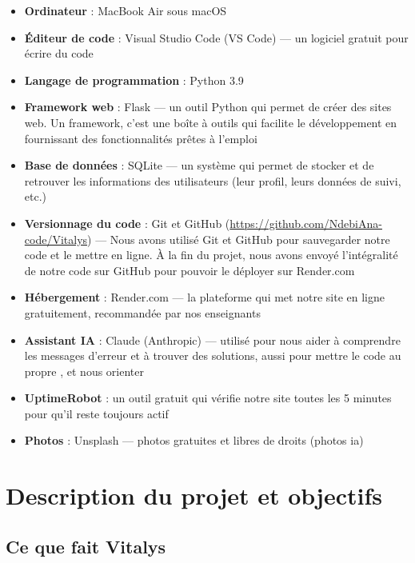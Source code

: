\documentclass[a4paper, 12pt, twoside]{article}
\begin{document}
\begin{itemize}
    \item \textbf{Ordinateur} : MacBook Air sous macOS
    \item \textbf{Éditeur de code} : Visual Studio Code (VS Code) — un logiciel gratuit pour écrire du code
    \item \textbf{Langage de programmation} : Python 3.9
    \item \textbf{Framework web} : Flask — un outil Python qui permet de créer des sites web. Un framework, c'est une boîte à outils qui facilite le développement en fournissant des fonctionnalités prêtes à l'emploi
    \item \textbf{Base de données} : SQLite — un système qui permet de stocker et de retrouver les informations des utilisateurs (leur profil, leurs données de suivi, etc.)
    \item \textbf{Versionnage du code} : Git et GitHub (\url{https://github.com/NdebiAna-code/Vitalys}) — Nous avons utilisé Git et GitHub pour sauvegarder notre code et le mettre en ligne. À la fin du projet, nous avons envoyé l’intégralité de notre code sur GitHub pour pouvoir le déployer sur Render.com    \item \textbf{Hébergement} : Render.com — la plateforme qui met notre site en ligne gratuitement, recommandée par nos enseignants
    \item \textbf{Assistant IA} : Claude (Anthropic) — utilisé pour nous aider à comprendre les messages d'erreur et à trouver des solutions, aussi pour mettre le code au propre , et nous orienter 
    \item \textbf{UptimeRobot} : un outil gratuit qui vérifie notre site toutes les 5 minutes pour qu'il reste toujours actif
    \item \textbf{Photos} : Unsplash — photos gratuites et libres de droits (photos ia)
\end{itemize}

\section{Description du projet et objectifs}

\subsection{Ce que fait Vitalys}
\end{document}
